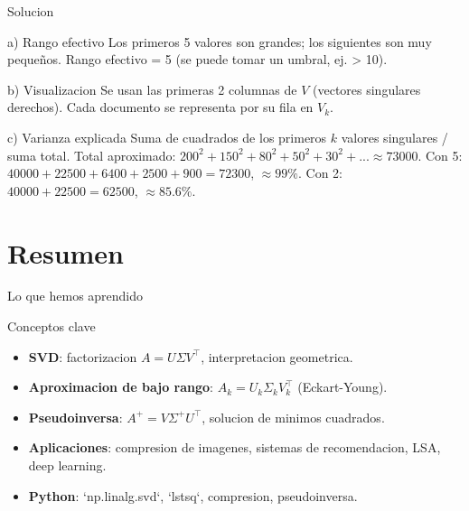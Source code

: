 \documentclass[aspectratio=169, 10pt, xcolor=table]{beamer}
\begin{document}
\begin{frame}{Solucion}
    \begin{block}{a) Rango efectivo}
        Los primeros 5 valores son grandes; los siguientes son muy pequeños. Rango efectivo = 5 (se puede tomar un umbral, ej. > 10).
    \end{block}
    \begin{block}{b) Visualizacion}
        Se usan las primeras 2 columnas de $V$ (vectores singulares derechos). Cada documento se representa por su fila en $V_k$.
    \end{block}
    \begin{block}{c) Varianza explicada}
        Suma de cuadrados de los primeros $k$ valores singulares / suma total.
        Total aproximado: $200^2+150^2+80^2+50^2+30^2+...\approx 73000$.
        Con 5: $40000+22500+6400+2500+900 = 72300$, $\approx 99\%$.
        Con 2: $40000+22500 = 62500$, $\approx 85.6\%$.
    \end{block}
\end{frame}

\section{Resumen}

\begin{frame}{Lo que hemos aprendido}
    \begin{exampleblock}{Conceptos clave}
        \begin{itemize}
            \item \textbf{SVD}: factorizacion $A = U\Sigma V^\top$, interpretacion geometrica.
            \item \textbf{Aproximacion de bajo rango}: $A_k = U_k\Sigma_k V_k^\top$ (Eckart-Young).
            \item \textbf{Pseudoinversa}: $A^+ = V\Sigma^+ U^\top$, solucion de minimos cuadrados.
            \item \textbf{Aplicaciones}: compresion de imagenes, sistemas de recomendacion, LSA, deep learning.
            \item \textbf{Python}: `np.linalg.svd`, `lstsq`, compresion, pseudoinversa.
        \end{itemize}
    \end{exampleblock}
\end{frame}
\end{document}
